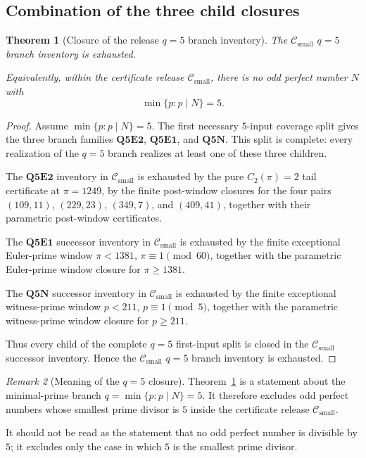 \documentclass[11pt]{article}
\newtheorem{theorem}{Theorem}[section]
\theoremstyle{definition}
\theoremstyle{remark}
\newtheorem{remark}[theorem]{Remark}
\newcommand{\Csmall}{\ensuremath{\mathcal C_{\mathrm{small}}}}
\begin{document}
\subsection{Combination of the three child closures}
\label{subsec:q5-current-branch-inventory-closure}

\begin{theorem}[Closure of the release \texorpdfstring{\(q=5\)}{q=5} branch inventory]
\label{thm:q5-current-branch-inventory-closed}
The \(\Csmall\) \(q=5\) branch inventory is exhausted.

Equivalently, within the certificate release \(\Csmall\), there is no odd
perfect number \(N\) with
\[
  \min\{p:p\mid N\}=5.
\]
\end{theorem}

\begin{proof}
Assume \(\min\{p:p\mid N\}=5\).  The first necessary \(5\)-input coverage split
gives the three branch families \(\mathbf{Q5E2}\), \(\mathbf{Q5E1}\), and
\(\mathbf{Q5N}\).  This split is complete: every realization of the \(q=5\)
branch realizes at least one of these three children.

The \(\mathbf{Q5E2}\) inventory in \(\Csmall\) is exhausted by the pure
\(C_2(\pi)=2\) tail certificate at \(\pi=1249\), by the finite post-window
closures for the four pairs \((109,11)\), \((229,23)\), \((349,7)\), and
\((409,41)\), together with their parametric post-window
certificates.

The \(\mathbf{Q5E1}\) successor inventory in \(\Csmall\) is exhausted by the
finite exceptional Euler-prime window \(\pi<1381\), \(\pi\equiv1\pmod{60}\),
together with the parametric Euler-prime window closure for \(\pi\ge1381\).

The \(\mathbf{Q5N}\) successor inventory in \(\Csmall\) is exhausted by the
finite exceptional witness-prime window \(p<211\), \(p\equiv1\pmod5\), together
with the parametric witness-prime window closure for \(p\ge211\).

Thus every child of the complete \(q=5\) first-input split is closed in the
\(\Csmall\) successor inventory.  Hence the \(\Csmall\) \(q=5\) branch
inventory is exhausted.
\end{proof}

\begin{remark}[Meaning of the \(q=5\) closure]
\label{rem:meaning-of-q5-closure}
Theorem~\ref{thm:q5-current-branch-inventory-closed} is a statement about the
minimal-prime branch \(q=\min\{p:p\mid N\}=5\).  It therefore excludes odd
perfect numbers whose smallest prime divisor is \(5\) inside the certificate
release \(\Csmall\).

It should not be read as the statement that no odd perfect number is divisible
by \(5\); it excludes only the case in which \(5\) is the smallest prime
divisor.
\end{remark}
\end{document}
